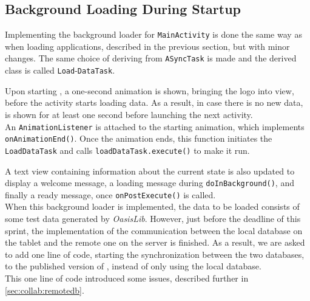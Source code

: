 \subsection{Background Loading During Startup}\label{sec:sprint4:dev:remotedbandbgloading}

Implementing the background loader for \lstinline|MainActivity| is done the same way as when loading applications, described in the previous section, but with minor changes.
The same choice of deriving from \lstinline!ASyncTask! is made and the derived class is called \lstinline!Load!-\lstinline!DataTask!.

Upon starting \launcher, a one-second animation is shown, bringing the logo into view, before the activity starts loading data.
As a result, in case there is no new data, \mainactivity is shown for at least one second before launching the next activity.\\

An \lstinline!AnimationListener! is attached to the starting animation, which implements \lstinline|onAnimationEnd()|.
Once the animation ends, this function initiates the \lstinline!LoadDataTask! and calls \lstinline!loadDataTask.execute()! to make it run.

A text view containing information about the current state is also updated to display a welcome message, a loading message during \lstinline|doInBackground()|, and finally a ready message, once \lstinline|onPostExecute()| is called.\\

When this background loader is implemented, the data to be loaded consists of some test data generated by \textit{OasisLib}.
However, just before the deadline of this sprint, the implementation of the communication between the local database on the tablet and the remote one on the server is finished.
As a result, we are asked to add one line of code, starting the synchronization between the two databases, to the published version of \launcher, instead of only using the local database.\\

This one line of code introduced some issues, described further in \cref{sec:collab:remotedb}.